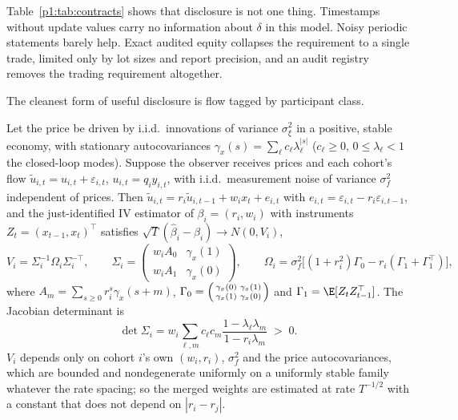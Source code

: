 Table~\ref{p1:tab:contracts} shows that disclosure is not one thing. Timestamps without update values carry no information about $\delta$ in this model. Noisy periodic statements barely help. Exact audited equity collapses the requirement to a single trade, limited only by lot sizes and report precision, and an audit registry removes the trading requirement altogether.

The cleanest form of useful disclosure is flow tagged by participant class.

\begin{proposition}\label{p1:prop:tagged}
Let the price be driven by i.i.d.\ innovations of variance $\sigma_\xi^2$ in a positive, stable economy, with stationary autocovariances $\gamma_x(s)=\sum_\ell c_\ell\lambda_\ell^{|s|}$ ($c_\ell\ge0$, $0\le\lambda_\ell<1$ the closed-loop modes). Suppose the observer receives prices and each cohort's flow $\tilde u_{i,t}=u_{i,t}+\varepsilon_{i,t}$, $u_{i,t}=q_iy_{i,t}$, with i.i.d.\ measurement noise of variance $\sigma_f^2$ independent of prices. Then $\tilde u_{i,t}=r_i\tilde u_{i,t-1}+w_ix_t+e_{i,t}$ with $e_{i,t}=\varepsilon_{i,t}-r_i\varepsilon_{i,t-1}$, and the just-identified IV estimator of $\beta_i=(r_i,w_i)$ with instruments $Z_t=(x_{t-1},x_t)^\top$ satisfies $\sqrt T(\hat\beta_i-\beta_i)\to N(0,V_i)$,
\begin{equation}\label{p1:eq:ivvar}
V_i=\Sigma_i^{-1}\Omega_i\Sigma_i^{-\top},\qquad \Sigma_i=\begin{pmatrix}w_iA_0&\gamma_x(1)\\ w_iA_1&\gamma_x(0)\end{pmatrix},\qquad \Omega_i=\sigma_f^2\bigl[(1+r_i^2)\Gamma_0-r_i(\Gamma_1+\Gamma_1^\top)\bigr],
\end{equation}
where $A_m=\sum_{s\ge0}r_i^s\gamma_x(s+m)$, $\Gamma_0=\begin{psmallmatrix}\gamma_x(0)&\gamma_x(1)\\ \gamma_x(1)&\gamma_x(0)\end{psmallmatrix}$ and $\Gamma_1=\E[Z_tZ_{t-1}^\top]$. The Jacobian determinant is
\begin{equation}\label{p1:eq:ivdet}
\det\Sigma_i=w_i\sum_{\ell,m}c_\ell c_m\frac{1-\lambda_\ell\lambda_m}{1-r_i\lambda_m}\;>\;0 .
\end{equation}
$V_i$ depends only on cohort $i$'s own $(w_i,r_i)$, $\sigma_f^2$ and the price autocovariances, which are bounded and nondegenerate uniformly on a uniformly stable family whatever the rate spacing; so the merged weights are estimated at rate $T^{-1/2}$ with a constant that does not depend on $|r_i-r_j|$.
\end{proposition}

